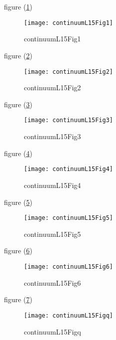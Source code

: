 
\section{}

figure (\ref{fig:continuumL15:continuumL15Fig1})
\begin{figure}[htp]
   \centering
   \texttt{[image: continuumL15Fig1]}
   \caption{continuumL15Fig1}\label{fig:continuumL15:continuumL15Fig1}
\end{figure}
figure (\ref{fig:continuumL15:continuumL15Fig2})
\begin{figure}[htp]
   \centering
   \texttt{[image: continuumL15Fig2]}
   \caption{continuumL15Fig2}\label{fig:continuumL15:continuumL15Fig2}
\end{figure}
figure (\ref{fig:continuumL15:continuumL15Fig3})
\begin{figure}[htp]
   \centering
   \texttt{[image: continuumL15Fig3]}
   \caption{continuumL15Fig3}\label{fig:continuumL15:continuumL15Fig3}
\end{figure}
figure (\ref{fig:continuumL15:continuumL15Fig4})
\begin{figure}[htp]
   \centering
   \texttt{[image: continuumL15Fig4]}
   \caption{continuumL15Fig4}\label{fig:continuumL15:continuumL15Fig4}
\end{figure}
figure (\ref{fig:continuumL15:continuumL15Fig5})
\begin{figure}[htp]
   \centering
   \texttt{[image: continuumL15Fig5]}
   \caption{continuumL15Fig5}\label{fig:continuumL15:continuumL15Fig5}
\end{figure}
figure (\ref{fig:continuumL15:continuumL15Fig6})
\begin{figure}[htp]
   \centering
   \texttt{[image: continuumL15Fig6]}
   \caption{continuumL15Fig6}\label{fig:continuumL15:continuumL15Fig6}
\end{figure}
figure (\ref{fig:continuumL15:continuumL15Figq})
\begin{figure}[htp]
   \centering
   \texttt{[image: continuumL15Figq]}
   \caption{continuumL15Figq}\label{fig:continuumL15:continuumL15Figq}
\end{figure}

\EndArticle

